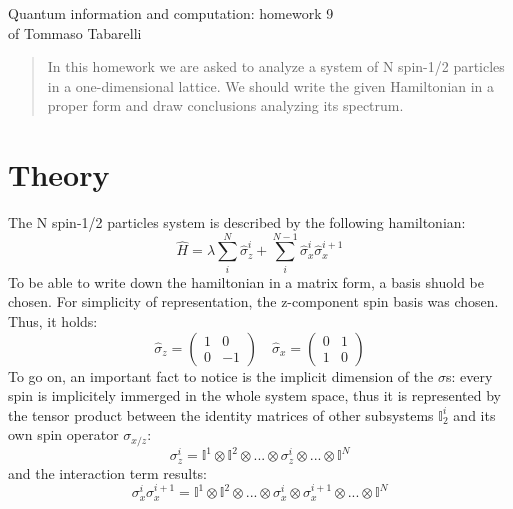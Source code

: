 \documentclass[12pt, a4paper, notitlepage]{report}
\begin{document}
\begin{center}
	\LARGE{Quantum information and computation: homework 9}\\
	\Large{of Tommaso Tabarelli}
\end{center}


\begin{abstract}
	In this homework we are asked to analyze a system of N spin-1/2 particles in a one-dimensional lattice. We should write the given Hamiltonian in a proper form and draw conclusions analyzing its spectrum.
\end{abstract}

\section*{Theory}

The N spin-1/2 particles system is described by the following hamiltonian:
\begin{equation}
\hat{H} = \lambda \sum_{i}^{N} \hat{\sigma}_z^i + \sum_{i}^{N-1} \hat{\sigma}_x^i \hat{\sigma}_x^{i+1}
\end{equation}
To be able to write down the hamiltonian in a matrix form, a basis shuold be chosen. For simplicity of representation, the z-component spin basis was chosen. Thus, it holds:
\begin{equation}
	\hat{\sigma}_z = \left(
	\begin{matrix}
		1 & 0 \\
		0 & -1
	\end{matrix} \right)
	\quad
	\hat{\sigma}_x = \left(
	\begin{matrix}
		0 & 1 \\
		1 & 0
	\end{matrix}
	\right)
\end{equation}
To go on, an important fact to notice is the implicit dimension of the $\sigma$s: every spin is implicitely immerged in the whole system space, thus it is represented by the tensor product between the identity matrices of other subsystems $\mathbb{I}_2^i$ and its own spin operator $\sigma_{x/z}$:
\begin{equation}
\sigma_z^i = \mathbb{I}^1 \otimes \mathbb{I}^2 \otimes ... \otimes \sigma_z^i \otimes ... \otimes \mathbb{I}^N
\end{equation}
and the interaction term results:
\begin{equation}
	\sigma_x^i \sigma_x^{i+1} = \mathbb{I}^1 \otimes \mathbb{I}^2 \otimes ... \otimes \sigma_x^i \otimes \sigma_x^{i+1} \otimes ... \otimes \mathbb{I}^N
\end{equation}
\end{document}
